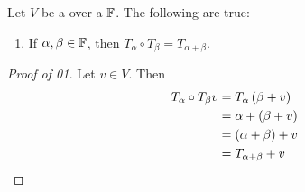 \begin{prop}[\TranslationOperator]
    \label{prop:TranslationOperatorAlgebraicProperties}
    Let $V$
    be a 
    \VectorSpace
    over a 
    \Field
    $\mathbb{F}$. 
    The following are true:
    \begin{enumerate}
        \item If $\alpha, \beta \in \mathbb{F}$, then $T_\alpha \circ T_\beta = T_{\alpha + \beta}$. 
    \end{enumerate}


    \begin{proof}[Proof of 01]
        Let $v \in V$. Then 
        \begin{align*}
            T_{\alpha} \circ T_{\beta} v & = T_\alpha \left( \beta + v \right) \\
            & = \alpha + (\beta + v) \\
            & = (\alpha + \beta) + v \\
            & = T_{\alpha+\beta}+v
        \end{align*}
    \end{proof} 

\end{prop}

